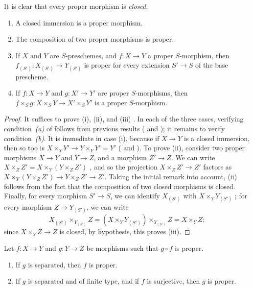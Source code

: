 It is clear that every proper morphism is \emph{closed}.

\begin{prop}[5.4.2]
\label{2.5.4.2}
\medskip\noindent
\begin{enumerate}[label=\emph{(\roman*)}]
    \item A closed immersion is a proper morphism.
    \item The composition of two proper morphisms is proper.
    \item If $X$ and $Y$ are $S$-preschemes, and $f:X\to Y$ a proper $S$-morphism, then $f_{(S')}:X_{(S')}\to Y_{(S')}$ is proper for every extension $S'\to S$ of the base prescheme.
    \item If $f:X\to Y$ and $g:X'\to Y'$ are proper $S$-morphisms, then $f\times_S g:X\times_S Y\to X'\times_S Y'$ is a proper $S$-morphism.
\end{enumerate}
\end{prop}

\begin{proof}
\label{proof-2.5.4.2}
It suffices to prove (i), (ii), and (iii) .
In each of the three cases, verifying condition~\emph{(a)} of  follows from previous results ( and );
it remains to verify condition~\emph{(b)}.
It is immediate in case (i), because if $X\to Y$ is a closed immersion, then so too is $X\times_Y Y'\to Y\times_Y Y'=Y'$ ( and ).
To prove (ii), consider two proper morphisms $X\to Y$ and $Y\to Z$, and a morphism $Z'\to Z$.
We can write $X\times_Z Z'=X\times_Y(Y\times_Z Z')$ , and so the projection $X\times_Z Z'\to Z'$ factors as $X\times_Y(Y\times_Z Z')\to Y\times_Z Z'\to Z'$.
Taking the initial remark into account, (ii) follows from the fact that the composition of two closed morphisms is closed.
Finally, for every morphism $S'\to S$, we can identify $X_{(S')}$ with $X\times_Y Y_{(S')}$ ;
for every morphism $Z\to Y_{(S')}$, we can write
\[
    X_{(S')}\times_{Y_{(S')}}Z = (X\times_Y Y_{(S')})\times_{Y_{(S')}}Z = X\times_Y Z;
\]
since $X\times_Y Z\to Z$ is closed, by hypothesis, this proves (iii).
\end{proof}

\begin{cor}[5.4.3]
\label{2.5.4.3}
Let $f:X\to Y$ and $g:Y\to Z$ be morphisms such that $g\circ f$ is proper.
\begin{enumerate}[label=\emph{(\roman*)}]
    \item If $g$ is separated, then $f$ is proper.
    \item If $g$ is separated and of finite type, and if $f$ is surjective, then $g$ is proper.
\end{enumerate}
\end{cor}

